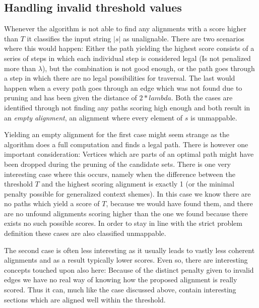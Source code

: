 \documentclass[thesis.tex]{subfiles}
\begin{document}
\subsection{Handling invalid threshold values}
Whenever the algorithm is not able to find any alignments with a score higher than $T$ it classifies the input string $|s|$ as unalignable. There are two scenarios where this would happen: Either the path yielding the highest score consists of a series of steps in which each individual step is considered legal (Is not penalized more than $\lambda$), but the combination is not good enough, or the path goes through a step in which there are no legal possibilities for traversal. The last would happen when a every path goes through an edge which was not found due to pruning and has been given the distance of $2*lambda$. Both the cases are identified through not finding any paths scoring high enough and both result in an \textit{empty alignment}, an alignment where every element of $s$ is unmappable. \\
\par\noindent
Yielding an empty alignment for the first case might seem strange as the algorithm does a full computation and finds a legal path. There is however one important consideration: Vertices which are parts of an optimal path might have been dropped during the pruning of the candidate sets. There is one very interesting case where this occurs, namely when the difference between the threshold $T$ and the highest scoring alignment is exactly 1 (or the minimal penalty possible for generalized context shemes). In this case we know there are no paths which yield a score of $T$, because we would have found them, and there are no unfound alignments scoring higher than the one we found because there exists no such possible scores. In order to stay in line with the strict problem definition these cases are also classified unmappable.\\
\par\noindent
The second case is often less interesting as it usually leads to vastly less coherent alignments and as a result typically lower scores. Even so, there are interesting concepts touched upon also here: Because of the distinct penalty given to invalid edges we have no real way of knowing how the proposed alignment is really scored. Thus it can, much like the case discussed above, contain interesting sections which are aligned well within the threshold.
\clearpage
\end{document}
